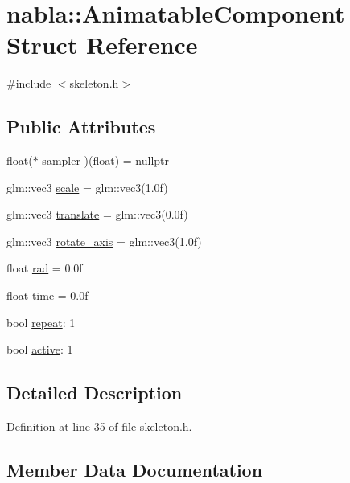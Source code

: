 \hypertarget{structnabla_1_1_animatable_component}{}\section{nabla\+::Animatable\+Component Struct Reference}
\label{structnabla_1_1_animatable_component}


{\ttfamily \#include $<$skeleton.\+h$>$}

\subsection*{Public Attributes}
\begin{DoxyCompactItemize}
\item 
float($\ast$ \mbox{\hyperlink{structnabla_1_1_animatable_component_a13230be4373b0f1c5d4ca0b0492d0f7b}{sampler}} )(float) = nullptr
\item 
glm\+::vec3 \mbox{\hyperlink{structnabla_1_1_animatable_component_aded50d1304dc41f747060a3d9e1f5ab3}{scale}} = glm\+::vec3(1.\+0f)
\item 
glm\+::vec3 \mbox{\hyperlink{structnabla_1_1_animatable_component_a069eeab904f683ec21994bcaa868496f}{translate}} = glm\+::vec3(0.\+0f)
\item 
glm\+::vec3 \mbox{\hyperlink{structnabla_1_1_animatable_component_a2a9954591e255f1975cd32c54442c6d9}{rotate\+\_\+axis}} = glm\+::vec3(1.\+0f)
\item 
float \mbox{\hyperlink{structnabla_1_1_animatable_component_a9c1c954738c8e824b067abcc65032fc8}{rad}} = 0.\+0f
\item 
float \mbox{\hyperlink{structnabla_1_1_animatable_component_aef3135043d1fa17db5fd838cea54a649}{time}} = 0.\+0f
\item 
bool \mbox{\hyperlink{structnabla_1_1_animatable_component_ad0923e9639c0f968ce154c7b53f15f66}{repeat}}\+: 1
\item 
bool \mbox{\hyperlink{structnabla_1_1_animatable_component_a32a2d524f5fd71fbd633fa1d6daab976}{active}}\+: 1
\end{DoxyCompactItemize}


\subsection{Detailed Description}


Definition at line 35 of file skeleton.\+h.



\subsection{Member Data Documentation}
\mbox{\label{structnabla_1_1_animatable_component_a32a2d524f5fd71fbd633fa1d6daab976}} 
